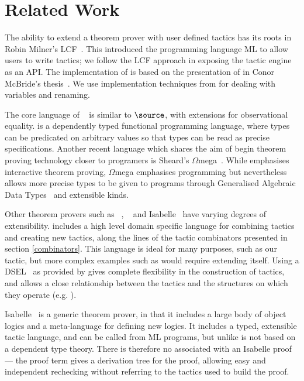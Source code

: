 \section{Related Work}

The ability to extend a theorem prover with user defined tactics has
its roots in Robin Milner's LCF~\cite{lcf-milner}. This introduced the
programming language ML to allow users to write tactics; we follow the
LCF approach in exposing the tactic engine as an API.
The implementation of \Ivor{} is based on the
presentation of \Oleg{} in Conor McBride's
thesis~\cite{mcbride-thesis}. We use implementation
techniques from \cite{not-a-number} for dealing with variables and
renaming.

The core language of \Epigram{}~\cite{view-left,epireloaded} is
similar to $\source$, with extensions for observational
equality. \Epigram{} is a dependently typed functional programming
language, where types can be predicated on arbitrary values so that
types can be read as precise specifications.
Another recent language which shares the aim of begin theorem proving
technology closer to programers is Sheard's
$\Omega$mega~\cite{sheard-langfuture}. While \Ivor{} emphasises
interactive theorem proving, $\Omega$mega emphasises programming but
nevertheless allows more precise types to be given to programs through
Generalised Algebraic Data Types~\cite{gadts} and extensible
kinds.

Other theorem provers such as \Coq{}~\cite{coq-manual},
\Agda{}~\cite{agda} and Isabelle~\cite{isabelle} have varying degrees
of extensibility.
\Coq{} includes a high level domain specific language for
combining tactics and creating new tactics, along the lines of the
tactic combinators presented in section \ref{combinators}. This
language is ideal for many purposes, such as our 
tactic, but more complex examples such as  would
require extending \Coq{} itself. Using a
DSEL~\cite{hudak-edsl} as provided by \Ivor{} gives complete
flexibility in the construction of tactics, and allows a close
relationship between the tactics and the structures on which they
operate (e.g. ).

Isabelle~\cite{isabelle} is a
generic theorem prover, in that it includes a large body of object
logics and a meta-language for defining new logics. It includes a
typed, extensible tactic language, and can be called from ML programs,
but unlike \Ivor{} is not based on a dependent type theory.
There is therefore no  associated with an Isabelle
proof --- the proof term gives a derivation tree for the
proof, allowing easy and independent rechecking without referring to
the tactics used to build the proof.

